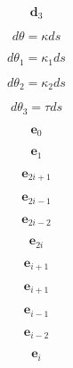 \documentclass[a4paper,11pt,fleqn]{book}
\newcommand{\vect}[1]{\boldsymbol{#1}}
\begin{document}
\begin{equation}
\vect{d}_{3}
\end{equation}


\begin{equation}
d \theta = \kappa ds
\end{equation}


\begin{equation}
d \theta_1 = \kappa_1 ds
\end{equation}


\begin{equation}
d \theta_2 = \kappa_2 ds
\end{equation}


\begin{equation}
d \theta_3 = \tau ds
\end{equation}


\begin{equation}
\vect{e}_0
\end{equation}


\begin{equation}
\vect{e}_1
\end{equation}


\begin{equation}
\vect{e}_{2i+1}
\end{equation}


\begin{equation}
\vect{e}_{2i-1}
\end{equation}


\begin{equation}
\vect{e}_{2i-2}
\end{equation}


\begin{equation}
\vect{e}_{2i}
\end{equation}


\begin{equation}
\vect{e}_{i+1}
\end{equation}


\begin{equation}
\vect{e}_{i+1}
\end{equation}


\begin{equation}
\vect{e}_{i-1}
\end{equation}


\begin{equation}
\vect{e}_{i-2}
\end{equation}


\begin{equation}
\vect{e}_i
\end{equation}
\end{document}

